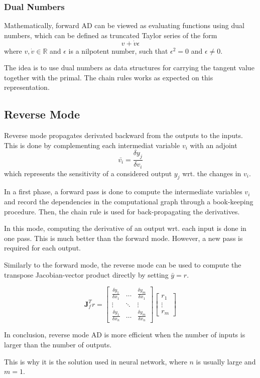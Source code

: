 \subsubsection{Dual Numbers}
Mathematically, forward AD can be viewed as evaluating functions using dual numbers, which can be defined as truncated Taylor series of the form
\begin{equation}
    v + \dot{v}\epsilon
\end{equation}
where $v, \dot{v} \in \mathbb{R}$ and $\epsilon$ is a nilpotent number, such that $\epsilon^2 = 0$ and $\epsilon \ne 0$.

The idea is to use dual numbers as data structures for carrying the tangent value together with the primal.
The chain rules works as expected on this representation.


\subsection{Reverse Mode}

Reverse mode propagates derivated backward from the outputs to the inputs. This is done by complementing each intermediat variable $v_i$ with an adjoint
\begin{equation}
    \bar{v_i} = \frac{\delta y_j}{\delta v_i}
\end{equation}
which represents the sensitivity of a considered output $y_j$ wrt. the changes in $v_i$.

In a first phase, a forward pass is done to compute the intermediate variables $v_i$ and record the dependencies in the computational graph through a book-keeping procedure.
Then, the chain rule is used for back-propagating the derivatives.


In this mode, computing the derivative of an output wrt. each input is done in one pass. This is much better than the forward mode. However, a new pass is required for each output.

Similarly to the forward mode, the reverse mode can be used to compute the transpose Jacobian-vector product directly by setting $\bar{y} = r$.

\begin{equation}
    \mathbf{J}_f^T r = \left[\begin{array}{ccc}
        \frac{\delta y_1}{\delta x_1} & \hdots & \frac{\delta y_m}{\delta x_1}  \\
        \vdots & \ddots & \vdots \\
        \frac{\delta y_1}{\delta x_n} & \hdots & \frac{\delta y_m}{\delta x_n}
    \end{array}\right]
    \left[\begin{array}{c}
        r_1 \\
        \vdots \\
        r_m
    \end{array}\right]
\end{equation}



In conclusion, reverse mode AD is more efficient when the number of inputs is larger than the number of outputs.

This is why it is the solution used in neural network, where $n$ is usually large and $m=1$.
